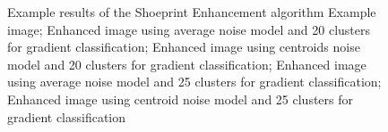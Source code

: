 \documentclass[draft,final]{vutinfth} %
\begin{document}
{\begin{figure}[H]

\caption{Example results of the Shoeprint Enhancement algorithm
				 Example image;  Enhanced image using average noise model and 20 clusters for gradient classification;  Enhanced image using centroids noise model and 20 clusters for gradient classification;  Enhanced image using average noise model and 25 clusters for gradient classification;  Enhanced image using centroid noise model and 25 clusters for gradient classification}
\label{fig:sans:res2}

\end{figure}
}
\end{document}
